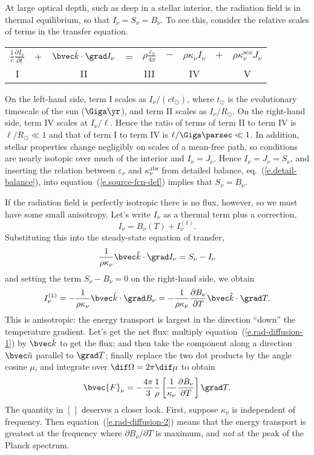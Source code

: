 At large optical depth, such as deep in a stellar interior, the radiation field is in thermal equilibrium, so that $I_{\nu} = S_{\nu} = B_{\nu}$. To see this, consider the relative scales of terms in the transfer equation.
\begin{center}\begin{tabular}{ccccccccc}
$\displaystyle \frac{1}{c}\frac{\partial I_{\nu}}{\partial t}$ & + &
$\displaystyle  \unitk\cdot\grad I_{\nu}$ & = &
$\displaystyle\rho\frac{\varepsilon_{\nu}}{4\pi} $ & $-$ & 
$\displaystyle \rho\kappa_{\nu} I_{\nu}$ & $+$ &
$\displaystyle \rho\kappa_{\nu}^{\mathrm{sca}} J_{\nu}$\\
I & & II & & III & & IV & & V
\end{tabular}
\end{center}
On the left-hand side, term I scales as $I_{\nu}/(c t_{\odot})$, where $t_{\odot}$ is the evolutionary timescale of the sun ($\Giga\yr$), and term II scales as $I_{\nu}/R_{\odot}$. On the right-hand side, term IV scales at $I_{\nu}/\ell$.  Hence the ratio of terms of term II to term IV is $\ell/R_{\odot}\ll 1$ and that of term I to term IV is $\ell/\Giga\parsec\ll 1$. In addition, stellar properties change negligibly on scales of a mean-free path, so conditions are nearly isotopic over much of the interior and $I_{\nu} = J_{\nu}$. Hence $I_{\nu} = J_{\nu} = S_{\nu}$, and inserting the relation between $\varepsilon_{\nu}$ and $\kappa_{\nu}^{\mathrm{abs}}$ from detailed balance, eq.~(\ref{e.detail-balance}), into equation~(\ref{e.source-fcn-def}) implies that $S_{\nu} = B_{\nu}$.

If the radiation field is perfectly isotropic there is no flux, however, so we must have some small anisotropy. Let's write $I_{\nu}$ as a thermal term plus a correction, 
\[ I_{\nu} = B_{\nu}(T) + I^{(1)}_{\nu}. \]
Substituting this into the steady-state equation of transfer,
\[ \frac{1}{\rho\kappa_{\nu}}\unitk\cdot\grad I_{\nu}  = S_{\nu} - I_{\nu}\]
and setting the term $S_{\nu}-B_{\nu}=0$ on the right-hand side, we obtain
\begin{equation}\label{e.rad-diffusion-1}
I_{\nu}^{(1)} = -\frac{1}{\rho\kappa_{\nu}} \unitk\cdot\grad B_{\nu} = -\frac{1}{\rho\kappa_{\nu}} \frac{\partial B_{\nu}}{\partial T} \unitk\cdot\grad T.
\end{equation}
This is anisotropic: the energy transport is largest in the direction ``down'' the temperature gradient. Let's get the net flux: multiply equation~(\ref{e.rad-diffusion-1}) by $\unitk$ to get the flux; and then take the component along a direction $\unitn$ parallel to $\grad T$; finally replace the two dot products by the angle cosine $\mu$, and integrate over $\dif \Omega = 2\pi \dif\mu$ to obtain
\begin{equation}\label{e.rad-diffusion-2}
\bvec{F}_{\nu} = -\frac{4\pi}{3}\frac{1}{\rho}\left[\frac{1}{\kappa_{\nu}}\frac{\partial B_{\nu}}{\partial T}\right]\grad T.
\end{equation}
The quantity in $[\,]$ deserves a closer look. First, suppose $\kappa_{\nu}$ is independent of frequency. Then equation~(\ref{e.rad-diffusion-2}) means that the energy transport is greatest at the frequency where $\partial B_{\nu}/\partial T$ is maximum, and \emph{not} at the peak of the Planck spectrum. 

